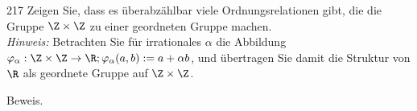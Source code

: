 \begin{algebraUE}{217}
Zeigen Sie, dass es überabzählbar viele Ordnungsrelationen gibt, die die Gruppe
$\Z \times \Z$ zu einer geordneten Gruppe machen. \\
\textit{Hinweis:} Betrachten Sie für irrationales $\alpha$ die Abbildung
$\varphi_{\alpha}: \Z \times \Z \to \R; \varphi_{\alpha}(a,b) := a + \alpha b$,
und übertragen Sie damit die Struktur von $\R$ als geordnete Gruppe auf $\Z \times \Z$.
\end{algebraUE}
\begin{solution}
Beweis.
\end{solution}
